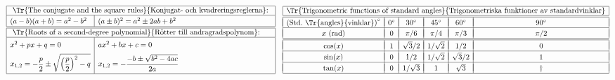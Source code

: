 \documentclass[a4paper]{article}%
\begin{document}
\subsubsection*{} %

{%
\let\F\frac
\newcommand\CC[1]{#1^\circ}
\def\vPad{&&&&&\\*[-10pt]}
\def\myEnd{\\\hline\vPad}
\newcommand\tW{{\sqrt2}}
\newcommand\tH{{\sqrt3}}
$
\begin{array}[m]{|l|l|}
\hline
\multicolumn{2}{|l|}{
  \mbox{ \Tr{The conjugate and the square rules}{Konjugat- och kvadreringsreglerna}: }
} \\
\hline

\rule[-4pt]{0pt}{15pt}
   (a-b)(a+b) = a^2-b^2 & (a\pm b)^2 = a^2\pm2ab+b^2 \\
\hline
\hline
\multicolumn{2}{|l|}{
  \mbox{ \Tr{Roots of a second-degree polynomial}{Rötter till andragradspolynom}: }
} \\
\hline
\rule[-2pt]{0pt}{15pt}
x^2+px+q = 0 & ax^2+bx+c = 0 \\
  \displaystyle
\rule[-10pt]{0pt}{32pt}
  x_{1,2} = -\frac p2\pm\sqrt{\Bigl(\frac p2\Bigr)^2-q}
&
  \displaystyle
   x_{1,2} = -\frac{-b\pm\sqrt{b^2-4ac}}{2a}
\\
\hline
\end{array}
\quad
\begin{array}{|c|c|c|c|c|c|}
\hline
\multicolumn{6}{|l|}{
  \mbox{\Tr{Trigonometric functions of standard angles}{Trigonometriska funktioner av standardvinklar}}
} \\
\hline
\hline\vPad
\mbox{(Std.~\Tr{angles}{vinklar})}^\circ
  & \CC{0} &\CC{30} &\CC{45} &\CC{60} &\CC{90}   %
 \myEnd
 x \mbox{ (rad)}
        & 0     & \pi/6 & \pi/4 &  \pi/3 & \pi/2 %
 \\\hline\hline\vPad
 \cos(x)&   1   & \tH/2 & 1/\tW &  1/2  &   0    %
 \myEnd
 \sin(x)&   0   &   1/2 & 1/\tW & \tH/2 &   1    %
 \myEnd
 \tan(x)&   0   & 1/\tH &   1   & \tH   &
                                    \dag %
 \\\hline
\end{array}
$
}%
\end{document}
